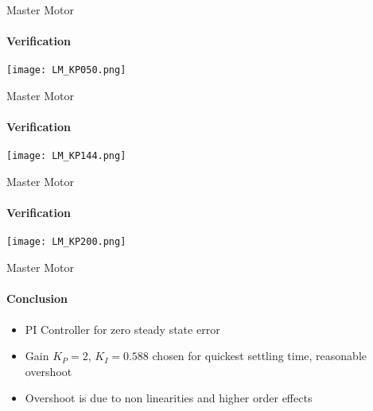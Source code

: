 \begin{frame}{Master Motor}
\framesubtitle{Verification}
\centering
\texttt{[image: LM\_KP050.png]}
\end{frame}


\begin{frame}{Master Motor}
\framesubtitle{Verification}
\centering
\texttt{[image: LM\_KP144.png]}
\end{frame}


\begin{frame}{Master Motor}
\framesubtitle{Verification}
\centering
\texttt{[image: LM\_KP200.png]}
\end{frame}

\begin{frame}{Master Motor}
\framesubtitle{Conclusion}
\begin{itemize}
\item PI Controller for zero steady state error
\item Gain $K_P = 2$, $K_I = 0.588$ chosen for quickest settling time, reasonable overshoot
\item Overshoot is due to non linearities and higher order effects
\end{itemize}
\end{frame}
